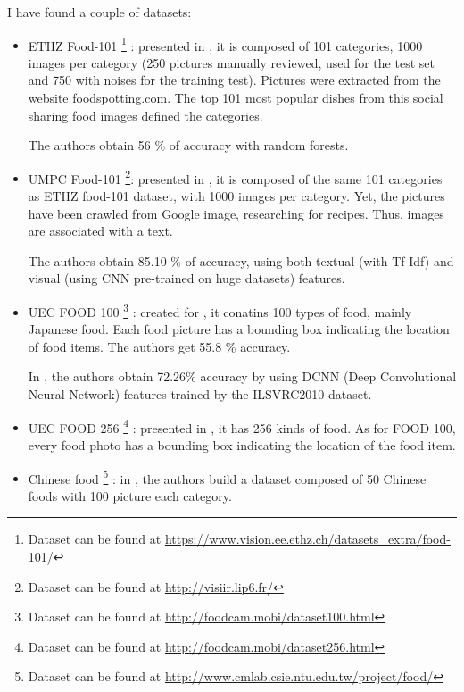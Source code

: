 I have found a couple of datasets:

\begin{itemize}
     \item ETHZ Food-101 \footnote{Dataset can be found at  \url{https://www.vision.ee.ethz.ch/datasets_extra/food-101/}} : presented in \cite{Bossard2014}, it is composed of 101 categories, 1000 images per category (250 pictures manually reviewed, used for the test set and 750 with noises for the training test). Pictures were extracted from the website \href{http://www.foodspotting.com/}{foodspotting.com}. The top 101 most popular dishes from this social sharing food images defined the categories.
     
     The authors obtain 56 \% of accuracy with random forests.
     
     \item UMPC Food-101 \footnote{Dataset can be found at \url{http://visiir.lip6.fr/}}: presented in \cite{Wang2015}, it is composed of the same 101 categories as ETHZ food-101 dataset, with 1000 images per category. Yet, the pictures have been crawled from Google image, researching for recipes. Thus, images are associated with a text.
     
     The authors obtain 85.10 \% of accuracy, using both textual (with Tf-Idf) and visual (using CNN pre-trained on huge datasets) features.
     
    \item UEC FOOD 100 \footnote{Dataset can be found at \url{http://foodcam.mobi/dataset100.html}} : created for \cite{Matsuda2012a}, it conatins 100 types of food, mainly Japanese food. Each food picture has a bounding box indicating the location of food items. The authors get 55.8 \% accuracy.
    
    In \cite{Kawano2014}, the authors obtain 72.26\% accuracy by using DCNN (Deep Convolutional Neural Network) features trained by the ILSVRC2010 dataset. 
    
    \item UEC FOOD 256 \footnote{Dataset can be found at \url{http://foodcam.mobi/dataset256.html}} : presented in \cite{Kawano2015}, it has 256 kinds of food. As for FOOD 100, every food photo has a bounding box indicating the location of the food item.
    
    \item Chinese food \footnote{Dataset can be found at \url{http://www.cmlab.csie.ntu.edu.tw/project/food/}} : in \cite{Chen2012}, the authors build a dataset composed of 50 Chinese foods with 100 picture each category.
    

\end{itemize}
